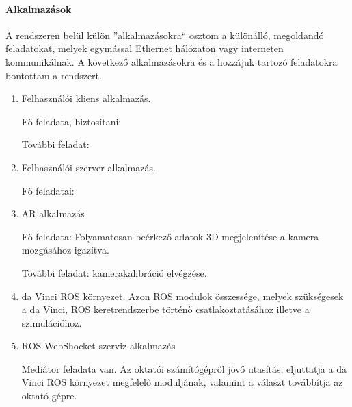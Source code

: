 \documentclass[12pt,a4paper,oneside]{report} %
\begin{document}
\paragraph{Alkalmazások}
A rendszeren belül külön ''alkalmazásokra`` osztom a különálló, megoldandó feladatokat, melyek egymással Ethernet hálózaton vagy interneten kommunikálnak.
A következő alkalmazásokra és a hozzájuk  tartozó feladatokra bontottam a rendszert.
\begin{enumerate}
	\item Felhasználói kliens alkalmazás.
	\par Fő feladata, biztosítani: 
	\par További feladat:

	
	\item Felhasználói szerver alkalmazás.
	\par Fő feladatai:

	\item AR alkalmazás
	\par Fő feladata: Folyamatosan beérkező adatok 3D megjelenítése a kamera mozgásához igazítva.
	\par További feladat: kamerakalibráció elvégzése.

	\item da Vinci ROS környezet. Azon ROS modulok összessége, melyek szükségesek a da Vinci, ROS keretrendszerbe történő csatlakoztatásához illetve a szimulációhoz.
	
	\item ROS WebShocket szerviz alkalmazás
	\par Mediátor feladata van. Az oktatói számítógépről jövő utasítás, eljuttatja  a da Vinci ROS környezet megfelelő moduljának, valamint a választ továbbítja az oktató gépre.
\end{enumerate}
\end{document}
